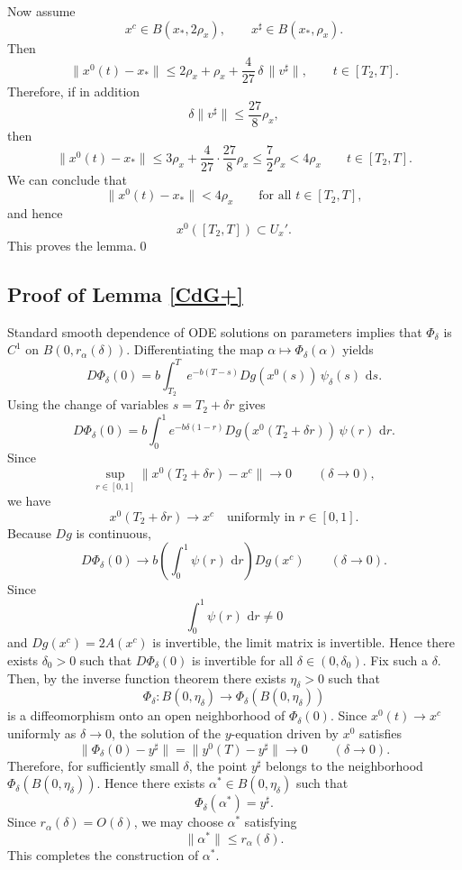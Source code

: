 \documentclass[11pt, a4paper,leqno]{amsart}
\theoremstyle{definition}
\numberwithin{equation}{section}
\def \d {{\delta}}
\renewcommand{\d}{\, \mathrm{d}} %
\begin{document}
Now assume
\[
x^c\in B(x_\ast,2\rho_x),\qquad x^\sharp\in B(x_\ast,\rho_x).
\]
Then
\[
\|x^0(t)-x_\ast\|
\le 2\rho_x+\rho_x+
\frac{4}{27}\,\delta\,\|v^\sharp\|,
\qquad t\in[T_2,T].
\]
Therefore, if in addition
\[
\delta\|v^\sharp\|\le \frac{27}{8}\rho_x,
\]
then
\[\|x^0(t)-x_\ast\|
\le 3\rho_x+
\frac{4}{27}\cdot \frac{27}{8}\rho_x\le \frac 72\rho_x<4\rho_x
\qquad t\in[T_2,T].
\]
We can conclude that
\[
\|x^0(t)-x_\ast\|<4\rho_x
\qquad\text{for all }t\in[T_2,T],
\]
and hence
\[
x^0([T_2,T])\subset U_x'.
\]
This proves the lemma.\qed





\subsection{Proof of Lemma \ref{CdG+}}\label{Pr3} Standard smooth dependence of ODE solutions on parameters implies that
\(\Phi_\delta\) is \(C^1\) on \(B(0,r_\alpha(\delta))\).
Differentiating the map \(\alpha\mapsto\Phi_\delta(\alpha)\) yields
\[
D\Phi_\delta(0)
=
b\int_{T_2}^{T}
e^{-b(T-s)}
Dg(x^0(s))\,\psi_\delta(s)\,\d s .
\]
Using the change of variables \(s=T_2+\delta r\) gives
\[
D\Phi_\delta(0)
=
b\int_0^1
e^{-b\delta(1-r)}
Dg(x^0(T_2+\delta r))\,\psi(r)\,\d r .
\]
Since
\[
\sup_{r\in[0,1]}
\|x^0(T_2+\delta r)-x^c\|\to0
\qquad (\delta\to0),
\]
we have
\[
x^0(T_2+\delta r)\to x^c
\quad\text{uniformly in } r\in[0,1].
\]
Because \(Dg\) is continuous,
\[
D\Phi_\delta(0)
\longrightarrow
b\left(\int_0^1\psi(r)\,\d r\right)Dg(x^c)
\qquad (\delta\to0).
\]
Since
\[
\int_0^1\psi(r)\,\d r\neq0
\]
and \(Dg(x^c)=2A(x^c)\) is invertible, the limit matrix is invertible.
Hence there exists \(\delta_0>0\) such that \(D\Phi_\delta(0)\) is
invertible for all \(\delta\in(0,\delta_0)\). Fix such a \(\delta\). Then, by the inverse function theorem there exists
\(\eta_\delta>0\) such that
\[
\Phi_\delta:
B(0,\eta_\delta)\to
\Phi_\delta(B(0,\eta_\delta))
\]
is a diffeomorphism onto an open neighborhood of \(\Phi_\delta(0)\). Since \(x^0(t)\to x^c\) uniformly as \(\delta\to0\), the solution of the
\(y\)-equation driven by \(x^0\) satisfies
\[
\|\Phi_\delta(0)-y^\sharp\|
=
\|y^0(T)-y^\sharp\|
\to0
\qquad (\delta\to0).
\]
Therefore, for sufficiently small \(\delta\), the point \(y^\sharp\)
belongs to the neighborhood
\(\Phi_\delta(B(0,\eta_\delta))\).
Hence there exists $\alpha^\ast\in B(0,\eta_\delta)$ such that
\[
\Phi_\delta(\alpha^\ast)=y^\sharp .
\]
Since \(r_\alpha(\delta)=O(\delta)\), we may choose
\(\alpha^\ast\) satisfying
\[
\|\alpha^\ast\|\le r_\alpha(\delta).
\]
This completes the construction of $\alpha^\ast$.
\end{document}
